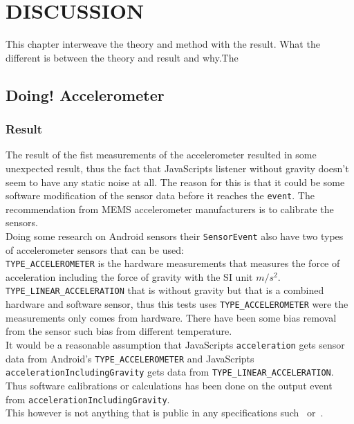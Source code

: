 \chapter{DISCUSSION}\label{cha:discussion}
This chapter interweave the theory and method with the result. What the different is between the theory and result and why.The

\section{\textbf{Doing! }Accelerometer}
\subsection{Result}
The result of the fist measurements of the accelerometer resulted in some unexpected result, thus the fact that JavaScripts listener without gravity doesn't seem to have any static noise at all. The reason for this is that it could be some software modification of the sensor data before it reaches the \texttt{event}. The recommendation from MEMS accelerometer manufacturers is to calibrate the sensors.~\cite[]{acc:kionixerr}\\ 
Doing some research on Android sensors their \texttt{SensorEvent} also have two types of accelerometer sensors that can be used: \\
\texttt{TYPE\_ACCELEROMETER} is the hardware measurements that measures the force of acceleration including the force of gravity with the SI unit $m/s^2$. \\
\texttt{TYPE\_LINEAR\_ACCELERATION} that is without gravity but that is a combined hardware and software sensor, thus this tests uses  \texttt{TYPE\_ACCELEROMETER} were the measurements only comes from hardware. There have been some bias removal from the sensor such bias from different temperature. \cite[]{android:sensorEvent}\\
It would be a reasonable assumption that JavaScripts \texttt{acceleration} gets sensor data from Android's \texttt{TYPE\_ACCELEROMETER} and JavaScripts \texttt{accelerationIncludingGravity} gets data from \texttt{TYPE\_LINEAR\_ACCELERATION}. Thus software calibrations or calculations has been done on the output event from \texttt{accelerationIncludingGravity}. \\
This however is not anything that is public in any specifications such~\cite[]{sensor:W3Cspec} or~\cite[]{sensor:accIncludingGravity}.\\ 
\\


